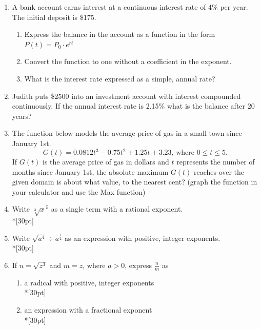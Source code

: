 \documentclass[12pt, oneside]{article}
\begin{document}
\begin{enumerate}
\newpage

\item A bank account earns interest at a continuous interest rate of 4\% per year. The initial deposit is \$175.
\begin{enumerate}
    \item Express the balance in the account as a function in the form $P(t)=P_0 \cdot e^{rt}$\\[30pt]
    \item Convert the function to one without a coefficient in the exponent. \\[30pt]
    \item What is the interest rate expressed as a simple, annual rate?\\[30pt]
\end{enumerate}

\item Judith puts \$2500 into an investment account with interest compounded continuously. If the annual interest rate is 2.15\% what is the balance after 20 years?\\[80pt]

\item The function below models the average price of gas in a small town since January 1st.
\[G(t)=0.0812t^3 - 0.75t^2 +1.25t+3.23 \text{, where } 0 \leq t \leq 5.\]
If $G(t)$ is the average price of gas in dollars and $t$ represents the number of months since January 1st, the absolute maximum $G(t)$ reaches over the given domain is about what value, to the nearest cent? (graph the function in your calculator and use the Max function)%

\newpage


\item Write $\sqrt[3]x^5$ as a single term with a rational exponent.\\*[30pt]

\item Write $\sqrt{a^4} \div a^{\frac{1}{2}}$ as an expression with positive, integer exponents.\\*[30pt]

\item If $n=\sqrt{z^3}$ and $m=z$, where $a > 0$, express $\frac{n}{m}$ as 
\begin{enumerate}
    \item a radical with positive, integer exponents\\*[30pt]
    \item an expression with a fractional exponent\\*[30pt]
\end{enumerate}


\end{enumerate}
\end{document}
